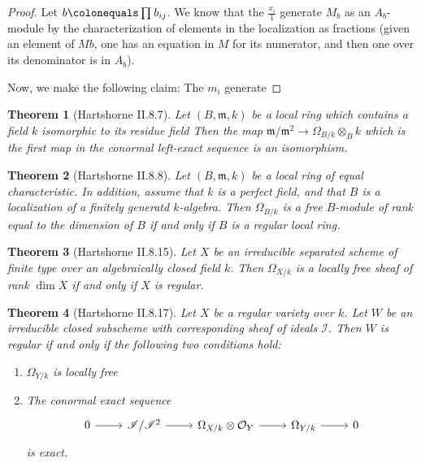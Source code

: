 \documentclass[a4paper]{article}
\newtheorem{thm}{Theorem}[section]
\newcommand{\conormal}{\mathscr{I} / \mathscr{I}^{2}}
\begin{document}
\begin{proof}
	Let \(b \colonequals \prod_{}^{} b_{ij}\). 
	We know that the \(\frac{x_{i}}{1}\) generate \(M_{b}\) as an
	\(A_{b}\)-module by the characterization of elements in the localization
	as fractions (given an element of \(M {b}\), one has an equation
	in \(M\) for its numerator, and then one over its denominator 
	is in \(A_{b}\)).




	Now, we make the following claim: 
	The \(m_{i}\) generate 
	


\end{proof}

\begin{thm}
	[Hartshorne II.8.7]
	Let \((B,\mathfrak{m},k)\) be a local ring 
	which contains a field \(k\) 
	isomorphic to its residue field
	Then the map 
	\(\mathfrak{m} / \mathfrak{m}^{2} \to \Omega_{B / k} \otimes_{B} k\)
	which is the first map in the 
	conormal left-exact sequence
	is an isomorphism.
\end{thm}


\begin{thm}
	[Hartshorne II.8.8]
	Let \((B,\mathfrak{m},k)\) be a local ring of
	equal characteristic.
	In addition, assume that
	\(k\) is a perfect field,
	and that \(B\) is a localization of
	a finitely generatd \(k\)-algebra.
	Then \(\Omega_{B / k}\) is a free \(B\)-module
	of rank equal to the dimension of \(B\) 
	if and only if \(B\) is a regular local ring.

\end{thm}


\begin{thm}
	[Hartshorne II.8.15]
	Let \(X\) be an irreducible separated scheme of finite type 
	over an algebraically closed field \(k\).
	Then \(\Omega_{X / k}\) is a locally free
	sheaf of rank \(\dim X\) if and only if 
	\(X\) is regular.
\end{thm}


\begin{thm}
	[Hartshorne II.8.17]
	Let \(X\) be a regular variety over \(k\).
	Let \(W\) be an irreducible closed subscheme 
	with corresponding sheaf of ideals \(\mathscr{I}\).
	Then \(W\) is regular if and only if the following
	two conditions hold:
	\begin{enumerate}[(1)]
		\item \(\Omega_{Y / k}\) is locally free
		\item The conormal exact sequence
			\[
			\begin{tikzcd}
			0 \arrow{r}{} & \conormal \arrow{r}{} & 
			\Omega_{X / k} \otimes \mathcal{O}_{Y}  \arrow{r}{} & 
			\Omega_{Y / k} \arrow{r}{} & 0
			\end{tikzcd}
			\]
			is exact.
	\end{enumerate}
\end{thm}
\end{document}
